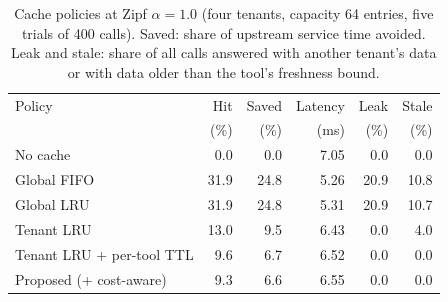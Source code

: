 \begin{table}[t]
\centering
\caption{Cache policies at Zipf $\alpha = 1.0$ (four tenants, capacity 64 entries, five trials of 400 calls). Saved: share of upstream service time avoided. Leak and stale: share of all calls answered with another tenant's data or with data older than the tool's freshness bound.}
\label{tab:cache}
\setlength{\tabcolsep}{3pt}
\begin{tabular}{l rrrrr}
\toprule
Policy & Hit & Saved & Latency & Leak & Stale \\
 & (\%) & (\%) & (ms) & (\%) & (\%) \\
\midrule
No cache & 0.0 & 0.0 & 7.05 & 0.0 & 0.0 \\
Global FIFO & 31.9 & 24.8 & 5.26 & 20.9 & 10.8 \\
Global LRU & 31.9 & 24.8 & 5.31 & 20.9 & 10.7 \\
Tenant LRU & 13.0 & 9.5 & 6.43 & 0.0 & 4.0 \\
Tenant LRU + per-tool TTL & 9.6 & 6.7 & 6.52 & 0.0 & 0.0 \\
Proposed (+ cost-aware) & 9.3 & 6.6 & 6.55 & 0.0 & 0.0 \\
\bottomrule
\end{tabular}
\end{table}
